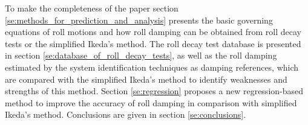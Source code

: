 To make the completeness of the paper section \ref{se:methods_for_prediction_and_analysis} presents the basic governing equations of roll motions and how roll damping can be obtained from roll decay tests or the simplified Ikeda's method. 
The roll decay test database is presented in section \ref{se:database_of_roll_decay_tests}, as well as the roll damping estimated by the system identification techniques as damping references, which are compared with the simplified Ikeda's method to identify weaknesses and strengths of this method. Section \ref{se:regression} proposes a new regression-based method to improve the accuracy of roll damping in comparison with simplified Ikeda's method. Conclusions are given in section \ref{se:conclusions}.  

